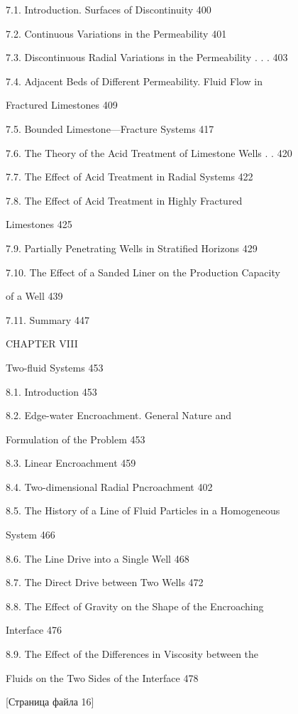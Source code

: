 \documentclass[
  11pt,
]{article}
\begin{document}
7.1. Introduction. Surfaces of Discontinuity 400 \par
7.2. Continuous Variations in the Permeability 401 \par
7.3. Discontinuous Radial Variations in the Permeability . . . 403 \par
7.4. Adjacent Beds of Different Permeability. Fluid Flow in \par
Fractured Limestones 409 \par
7.5. Bounded Limestone---Fracture Systems 417 \par
7.6. The Theory of the Acid Treatment of Limestone Wells . . 420 \par
7.7. The Effect of Acid Treatment in Radial Systems 422 \par
7.8. The Effect of Acid Treatment in Highly Fractured  \par
Limestones 425 \par
7.9. Partially Penetrating Wells in Stratified Horizons 429 \par
7.10. The Effect of a Sanded Liner on the Production Capacity \par
of a Well 439 \par
7.11. Summary 447 \par
CHAPTER VIII \par
Two-fluid Systems 453 \par
8.1. Introduction 453 \par
8.2. Edge-water Encroachment. General Nature and  \par
Formulation of the Problem 453 \par
8.3. Linear Encroachment 459 \par
8.4. Two-dimensional Radial P\textquotesingle ncroachment 402 \par
8.5. The History of a Line of Fluid Particles in a Homogeneous \par
System 466 \par
8.6. The Line Drive into a Single Well 468 \par
8.7. The Direct Drive between Two Wells 472 \par
8.8. The Effect of Gravity on the Shape of the Encroaching \par
Interface 476 \par
8.9. The Effect of the Differences in Viscosity between the \par
Fluids on the Two Sides of the Interface 478 \par
\smallskip
\smallskip
\smallskip
{[}Страница файла 16{]}\par
\end{document}

